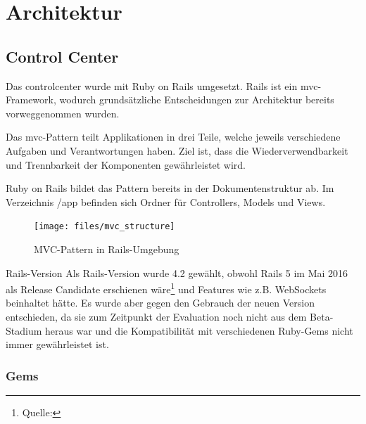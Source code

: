 \section{Architektur}


\subsection*{Control Center}

Das \gls{controlcenter} wurde mit Ruby on Rails umgesetzt. Rails ist ein \gls{mvc}-Framework, wodurch grundsätzliche Entscheidungen zur Architektur bereits vorweggenommen wurden.

Das \gls{mvc}-Pattern teilt Applikationen in drei Teile, welche jeweils verschiedene Aufgaben und Verantwortungen haben. Ziel ist, dass die Wiederverwendbarkeit und Trennbarkeit der Komponenten gewährleistet wird.

Ruby on Rails bildet das Pattern bereits in der Dokumentenstruktur ab. Im Verzeichnis /app befinden sich Ordner für Controllers, Models und Views.

\begin{figure}[H]
	\centering
	\texttt{[image: files/mvc\_structure]}
	\caption{MVC-Pattern in Rails-Umgebung}
	\label{fig:tec:mvc}
\end{figure}

\begin{decision}{Rails-Version}
Als Rails-Version wurde 4.2 gewählt, obwohl Rails 5 im Mai 2016 als Release Candidate erschienen wäre\footnote{Quelle: } und Features wie z.B. WebSockets beinhaltet hätte. Es wurde aber gegen den Gebrauch der neuen Version entschieden, da sie zum Zeitpunkt der Evaluation noch nicht aus dem Beta-Stadium heraus war und die Kompatibilität mit verschiedenen Ruby-Gems nicht immer gewährleistet ist.
\end{decision}

\subsubsection*{Gems}

